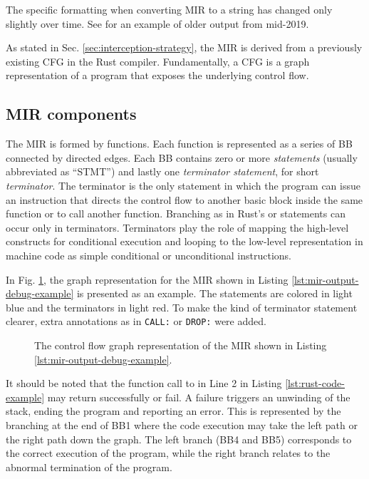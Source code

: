 The specific formatting when converting \acrshort{MIR} to a string has changed only slightly over time.
See \cite[Section 3.3]{meyer2020} for an example of older output from mid-2019.

As stated in Sec. \ref{sec:interception-strategy}, the \acrshort{MIR} is derived
from a previously existing \acrfull{CFG} in the Rust compiler.
Fundamentally, a \acrshort{CFG} is a graph representation of a program
that exposes the underlying control flow.

\subsection{MIR components}
\label{sec:mir-components}

The \acrshort{MIR} is formed by functions.
Each function is represented as a series of \acrfull{BB} connected by directed edges.
Each \acrshort{BB} contains zero or more \emph{statements} (usually abbreviated as ``STMT'')
and lastly one \emph{terminator statement}, for short \emph{terminator}.
The terminator is the only statement in which the program can issue an instruction
that directs the control flow to another basic block inside the same function
or to call another function.
Branching as in Rust's  or  statements can occur only in terminators.
Terminators play the role of mapping the high-level constructs
for conditional execution and looping to the low-level representation in machine code
as simple conditional or unconditional  instructions.

In Fig. \ref{fig:mir-cfg-example}, the graph representation
for the \acrshort{MIR} shown in Listing \ref{lst:mir-output-debug-example} is presented as an example.
The statements are colored in light blue and the terminators in light red.
To make the kind of terminator statement clearer,
extra annotations as in \texttt{CALL:} or \texttt{DROP:} were added.

\begin{figure}[!htb]
    \centering
    
    \caption{The control flow graph representation of the MIR shown in Listing \ref{lst:mir-output-debug-example}.}
    \label{fig:mir-cfg-example}
\end{figure}

It should be noted that the function call to 
in Line 2 in Listing \ref{lst:rust-code-example} may return successfully or fail.
A failure triggers an unwinding of the stack, ending the program and reporting an error.
This is represented by the branching at the end of BB1 where the code execution
may take the left path or the right path down the graph.
The left branch (BB4 and BB5) corresponds to the correct execution of the program,
while the right branch relates to the abnormal termination of the program.

